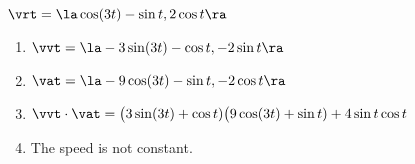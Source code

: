 {$\vrt = \la \cos(3t) - \sin t, 2\cos t \ra$
}
{\begin{enumerate}
\item $\vvt = \la -3\sin(3t) - \cos t, -2\sin t \ra$
\item $\vat = \la -9\cos(3t) - \sin t, -2\cos t \ra$
\item $\vvt \cdot \vat = \big(3\sin(3t) + \cos t) \big (9\cos(3t) + \sin t) + 4\sin t \cos t$
\item The speed is not constant.
\end{enumerate}
}

